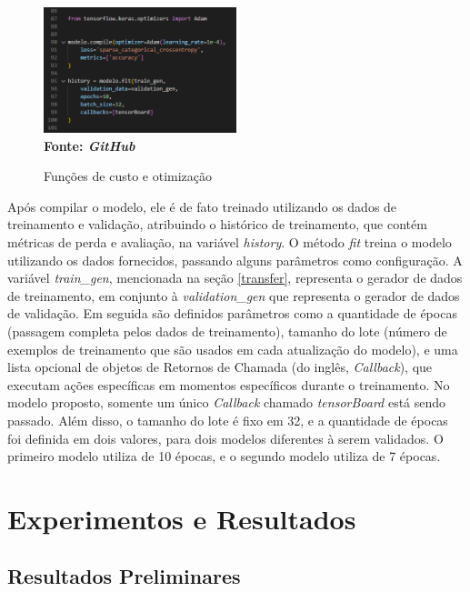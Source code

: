\begin{figure}[ht]
 	\centering	
 	\caption[\hspace{0.1cm}Grade Computacional.]{Funções de custo e otimização}
 	\vspace{-0.4cm}
 	\includegraphics[width=0.5\textwidth]{figuras/training.png}
 	\captionsetup{justification=centering}
	\vspace{-0.2cm}
     \\\textbf{\footnotesize Fonte: \textit{GitHub}}
	\label{fig:training}
\end{figure}

Após compilar o modelo, ele é de fato treinado utilizando os dados de treinamento e validação, atribuindo o histórico de treinamento, que contém métricas de perda e avaliação, na variável \textit{history}. O método \textit{fit} treina o modelo utilizando os dados fornecidos, passando alguns parâmetros como configuração. A variável \textit{train\_gen}, mencionada na seção \ref{transfer}, representa o gerador de dados de treinamento, em conjunto à \textit{validation\_gen} que representa o gerador de dados de validação. Em seguida são definidos parâmetros como a quantidade de épocas (passagem completa pelos dados de treinamento), tamanho do lote (número de exemplos de treinamento que são usados em cada atualização do modelo), e uma lista opcional de objetos de Retornos de Chamada (do inglês, \textit{Callback}), que executam ações específicas em momentos específicos durante o treinamento. No modelo proposto, somente um único \textit{Callback} chamado \textit{tensorBoard} está sendo passado. Além disso, o tamanho do lote é fixo em 32, e a quantidade de épocas foi definida em dois valores, para dois modelos diferentes à serem validados. O primeiro modelo utiliza de 10 épocas, e o segundo modelo utiliza de 7 épocas.


\section{\esp Experimentos e Resultados} \label{results}

\subsection{\esp Resultados Preliminares} \label{prelim}

